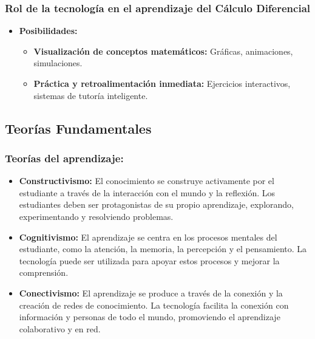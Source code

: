\documentclass{article}
\begin{document}
\subsubsection{Rol de la tecnología en el aprendizaje del Cálculo Diferencial}
\begin{itemize}
  \item \textbf{Posibilidades:} 
  \begin{itemize}
    \item \textbf{Visualización de conceptos matemáticos: }Gráficas, animaciones, simulaciones.
    \item \textbf{Práctica y retroalimentación inmediata: }Ejercicios interactivos, sistemas de tutoría inteligente.
  \end{itemize}
\end{itemize}

\subsection{Teorías Fundamentales}
\subsubsection{Teorías del aprendizaje:}
\begin{itemize}
  \item \textbf{Constructivismo:} El conocimiento se construye activamente por el estudiante a través de la interacción con el mundo y la reflexión. Los estudiantes deben ser protagonistas de su propio aprendizaje, explorando, experimentando y resolviendo problemas.
  \item \textbf{Cognitivismo:} El aprendizaje se centra en los procesos mentales del estudiante, como la atención, la memoria, la percepción y el pensamiento. La tecnología puede ser utilizada para apoyar estos procesos y mejorar la comprensión.
  \item \textbf{Conectivismo:} El aprendizaje se produce a través de la conexión y la creación de redes de conocimiento. La tecnología facilita la conexión con información y personas de todo el mundo, promoviendo el aprendizaje colaborativo y en red.
\end{itemize}
\end{document}
